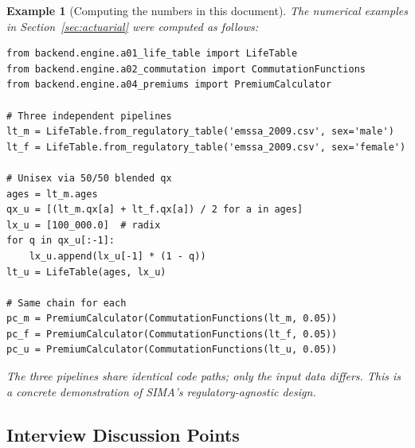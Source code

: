 \documentclass[12pt,a4paper]{article}
\newtheorem{example}[definition]{Example}
\begin{document}
\begin{example}[Computing the numbers in this document]
\label{ex:code}
The numerical examples in Section~\ref{sec:actuarial} were computed as follows:
\begin{verbatim}
from backend.engine.a01_life_table import LifeTable
from backend.engine.a02_commutation import CommutationFunctions
from backend.engine.a04_premiums import PremiumCalculator

# Three independent pipelines
lt_m = LifeTable.from_regulatory_table('emssa_2009.csv', sex='male')
lt_f = LifeTable.from_regulatory_table('emssa_2009.csv', sex='female')

# Unisex via 50/50 blended qx
ages = lt_m.ages
qx_u = [(lt_m.qx[a] + lt_f.qx[a]) / 2 for a in ages]
lx_u = [100_000.0]  # radix
for q in qx_u[:-1]:
    lx_u.append(lx_u[-1] * (1 - q))
lt_u = LifeTable(ages, lx_u)

# Same chain for each
pc_m = PremiumCalculator(CommutationFunctions(lt_m, 0.05))
pc_f = PremiumCalculator(CommutationFunctions(lt_f, 0.05))
pc_u = PremiumCalculator(CommutationFunctions(lt_u, 0.05))
\end{verbatim}

The three pipelines share identical code paths; only the input data differs.
This is a concrete demonstration of SIMA's regulatory-agnostic design.
\end{example}

\subsection{Interview Discussion Points}
\label{subsec:interview}
\end{document}
